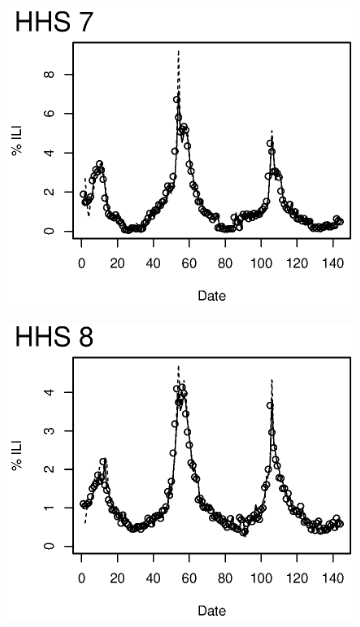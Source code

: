 \begin{figure}
\centering
\begin{subfigure}[b]{0.49\textwidth}
	\includegraphics[width=\textwidth]{longitude/figs/nowcastHHS_7.eps}
\end{subfigure}
\begin{subfigure}[b]{0.49\textwidth}
	\includegraphics[width=\textwidth]{longitude/figs/nowcastHHS_8.eps}
\end{subfigure}
\\

\end{figure}
